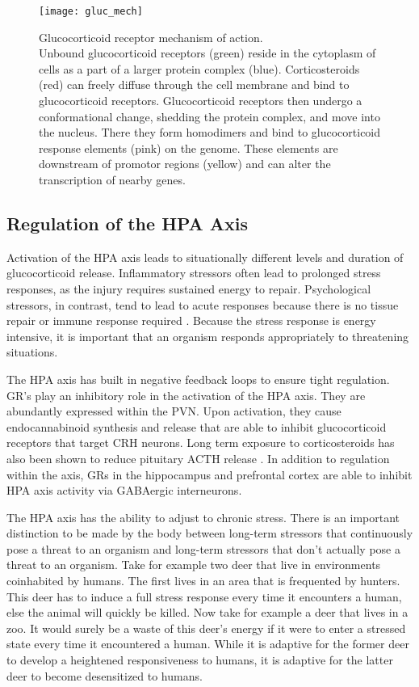 \documentclass[12pt,twoside]{reedthesis}
\begin{document}
\begin{figure}[htbp] 
\begin{centering} 
\texttt{[image: gluc\_mech]}
\caption[Glucocorticoid receptor mechanism of action]{\footnotesize{Glucocorticoid receptor
    mechanism of action. \\ Unbound glucocorticoid receptors (green) reside in the
    cytoplasm of cells as a part of a larger protein complex (blue). Corticosteroids (red) can freely diffuse through the
    cell membrane and bind to glucocorticoid receptors. Glucocorticoid receptors
    then undergo a conformational change, shedding the protein complex, and
    move into the nucleus. There they form homodimers and bind to
    glucocorticoid response elements (pink) on the genome. These elements are
    downstream of promotor regions (yellow) and can alter the transcription of
    nearby genes.}}
\label{subd}
\end{centering} 
\end{figure}

\subsection{Regulation of the HPA Axis}
Activation of the HPA axis leads to situationally different levels and duration of
glucocorticoid release. Inflammatory stressors often lead to prolonged stress
responses, as the injury requires sustained energy to repair. Psychological
stressors, in contrast, tend to lead to acute responses because there is no
tissue repair or immune response required \citep{terjung_regulation_2016}. Because
the stress response is energy intensive, it is important that an organism
responds appropriately to threatening situations.

The HPA axis has built in negative feedback loops to ensure tight regulation.
GR's play an inhibitory role in the activation of the HPA axis. They are abundantly expressed
within the PVN. Upon activation, they cause endocannabinoid synthesis and
release that are able to inhibit glucocorticoid receptors that target CRH
neurons. Long term exposure to corticosteroids has also been shown to reduce
pituitary ACTH release \citep{terjung_hypothalamic-pituitary-adrenal_2015}. In addition to regulation within the
axis, GRs in the hippocampus and prefrontal cortex are able to
inhibit HPA axis activity via GABAergic interneurons. 

The HPA axis has the ability to adjust to chronic stress. There is an
important distinction to be made by the body between long-term stressors that continuously
pose a threat to an organism and long-term stressors that don't actually pose a
threat to an organism. Take for example two deer that live in environments
coinhabited by humans. The first lives in an area that is
frequented by hunters. This deer has to induce a full stress response
every time it encounters a human, else the animal will quickly be killed.
Now take for example a deer that lives in a zoo. It would surely be a waste of this deer's
energy if it were to enter a stressed state every time it encountered a human.
While it is adaptive for the former deer to develop a heightened responsiveness
to humans, it is adaptive for the latter deer to become desensitized to humans.
\end{document}
